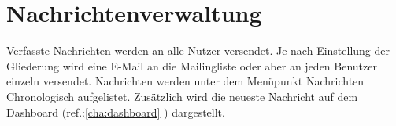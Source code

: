 \section{Nachrichtenverwaltung}
\label{sec:admin_news}
Verfasste Nachrichten werden an alle Nutzer versendet. Je nach Einstellung der Gliederung wird eine E-Mail an die Mailingliste oder aber an jeden Benutzer einzeln versendet.
Nachrichten werden unter dem Menüpunkt \glqq Nachrichten\grqq{} Chronologisch aufgelistet. Zusätzlich wird die neueste Nachricht auf dem Dashboard (ref.:\ref{cha:dashboard} ) dargestellt.